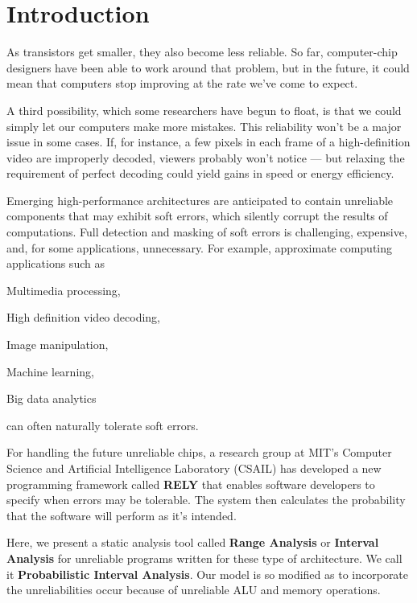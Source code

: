 \documentclass[final,3p, review, times]{util/elsarticle}
\begin{document}
\section{Introduction}

As transistors get smaller, they also become less reliable. So far, computer-chip designers have been able to work around that problem, but in the future, it could mean that computers stop improving at the rate we’ve come to expect.

A third possibility, which some researchers have begun to float, is that we could simply let our computers make more mistakes. This reliability won't be a major issue in some cases. If, for instance, a few pixels in each frame of a high-definition video are improperly decoded, viewers probably won’t notice --- but relaxing the requirement of perfect decoding could yield gains in speed or energy efficiency.

Emerging high-performance architectures are anticipated to contain unreliable components that may exhibit soft errors, which silently corrupt the results of computations. Full detection and masking of soft errors is challenging, expensive, and, for some applications, unnecessary. For example, approximate computing applications such as
\begin{inparaenum}
  \item Multimedia processing,
  \item High definition video decoding,
  \item Image manipulation,
  \item Machine learning,
  \item Big data analytics
\end{inparaenum}
can often naturally tolerate soft errors.

For handling the future unreliable chips, a research group at MIT's Computer Science and Artificial Intelligence Laboratory (CSAIL) has developed a new programming framework called \textbf{RELY}\cite{carbin13} that enables software developers to specify when errors may be tolerable. The system then calculates the probability that the software will perform as it's intended.

Here, we present a static analysis tool called \textbf{Range Analysis} or \textbf{Interval Analysis} for unreliable programs written for these type of architecture. We call it \textbf{Probabilistic Interval Analysis}. Our model is so modified as to incorporate the unreliabilities occur because of unreliable ALU and memory operations.
\end{document}

